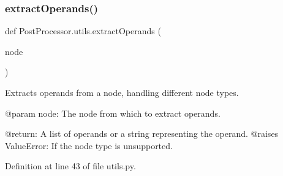 \subsubsection{\texorpdfstring{extract\+Operands()}{extractOperands()}}
{\footnotesize\ttfamily def Post\+Processor.\+utils.\+extract\+Operands (\begin{DoxyParamCaption}\item[{}]{node }\end{DoxyParamCaption})}

\begin{DoxyVerb}Extracts operands from a node, handling different node types.

@param node: The node from which to extract operands.

@return: A list of operands or a string representing the operand.
@raises ValueError: If the node type is unsupported.
\end{DoxyVerb}
 

Definition at line 43 of file utils.\+py.


